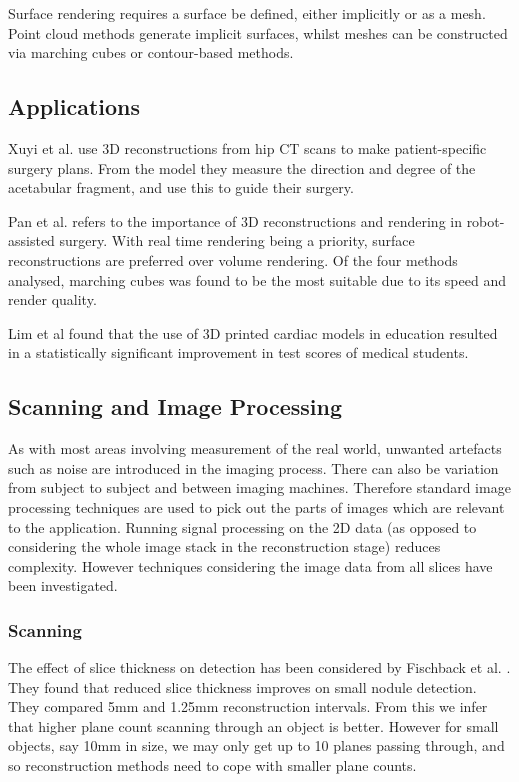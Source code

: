 \documentclass[11p, titlepage]{article}
\begin{document}
Surface rendering requires a surface be defined, either implicitly or as a mesh. Point cloud methods generate implicit surfaces, whilst meshes can be constructed via marching cubes or contour-based methods.

\subsection{Applications}

Xuyi et al. \cite{xuyi2016application} use 3D reconstructions from hip CT scans to make patient-specific surgery plans. From the model they measure the direction and degree of the acetabular fragment, and use this to guide their surgery.

Pan et al. \cite{pan2017comparison} refers to the importance of 3D reconstructions and rendering in robot-assisted surgery. With real time rendering being a priority, surface reconstructions are preferred over volume rendering. Of the four methods analysed, marching cubes was found to be the most suitable due to its speed and render quality.

Lim et al \cite{lim2016use} found that the use of 3D printed cardiac models in education resulted in a statistically significant improvement in test scores of medical students.

\subsection{Scanning and Image Processing}

As with most areas involving measurement of the real world, unwanted artefacts such as noise are introduced in the imaging process. There can also be variation from subject to subject and between imaging machines. Therefore standard image processing techniques are used to pick out the parts of images which are relevant to the application. Running signal processing on the 2D data (as opposed to considering the whole image stack in the reconstruction stage) reduces complexity. However techniques considering the image data from all slices have been investigated.

\subsubsection{Scanning}

The effect of slice thickness on detection has been considered by Fischback et al. \cite{fischbach2003detection}. They found that reduced slice thickness improves on small nodule detection. They compared 5mm and 1.25mm reconstruction intervals. From this we infer that higher plane count scanning through an object is better. However for small objects, say 10mm in size, we may only get up to 10 planes passing through, and so reconstruction methods need to cope with smaller plane counts.
\end{document}
